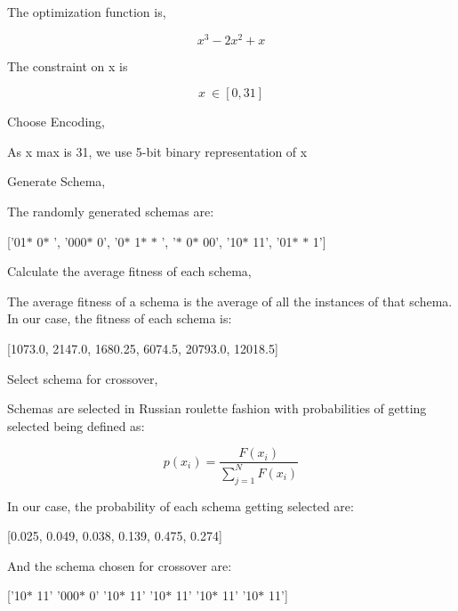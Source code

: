 \documentclass[12pt]{article}
\renewcommand{\_}{\kern-1.5pt\textunderscore\kern-1.5pt}
\begin{document}
The optimization function is, \par

 \[ x^{3}-2x^{2}+x \] \par

The constraint on x is \par

 \[ x~ \in   \left[ 0, 31 \right]  \] \par

Choose Encoding, \par

As x max is 31, we use 5-bit binary representation of x\par

Generate Schema, \par

The randomly generated schemas are: \par

[’01$\ast$ 0$\ast$ ’, ’000$\ast$ 0’, ’0$\ast$ 1$\ast$ $\ast$ ’, ’$\ast$ 0$\ast$ 00’, ’10$\ast$ 11’, ’01$\ast$ $\ast$ 1’]\par

Calculate the average fitness of each schema, \par

The average fitness of a schema is the average of all the instances of that schema. In our case, the fitness of each schema is: \par

[1073.0, 2147.0, 1680.25, 6074.5, 20793.0, 12018.5]\par

Select schema for crossover, \par

Schemas are selected in Russian roulette fashion with probabilities of getting selected being defined as:\par

 \[ p \left( x_{i} \right) = \frac{F \left( x_{i} \right) }{ \sum _{j=1}^{N}F \left( x_{i} \right) } \] \par

In our case, the probability of each schema getting selected are:\par

[0.025, 0.049, 0.038, 0.139, 0.475, 0.274] \par

And the schema chosen for crossover are:\par

[’10$\ast$ 11’ ’000$\ast$ 0’ ’10$\ast$ 11’ ’10$\ast$ 11’ ’10$\ast$ 11’ ’10$\ast$ 11’]\par
\end{document}
